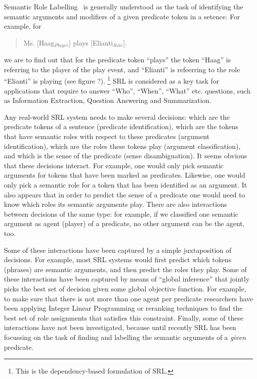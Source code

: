 
Semantic Role Labelling~\citep[SRL, ][]{carreras05introduction}
is generally understood as the task of identifying the semantic arguments
and modifiers of a given predicate token in a setence. For example,
for
\begin{quote}
Ms. {[}Haag$_{Player}$] plays {[}Elianti$_{Role}$].
\end{quote}
we are to find out that for the predicate token {}``plays'' the
token {}``Haag'' is referring to the player of the play event, and
{}``Elianti'' is refeerring to the role {}``Elianti'' is playing
(see figure ?).%
\footnote{This is the dependency-based formulation of SRL.%
} SRL is considered as a key task for applications that require to
answer {}``Who'', {}``When'', {}``What'' etc. questions, such
as Information Extraction, Question Answering and Summarization. 

Any real-world SRL system needs to make several decisions: which are
the predicate tokens of a sentence (predicate identification), which
are the tokens that have semantic roles with respect to these predicates
(argument identification), which are the roles these tokens play (argument
classification), and which is the sense of the predicate (sense disambiguation).
It seems obvious that these decisions interact. For example, one would
only pick semantic arguments for tokens that have been marked as predicates.
Likewise, one would only pick a semantic role for a token that has
been identified as an argument. It also appears that in order to predict
the sense of a predicate one would need to know which roles its semantic
arguments play. There are also interactions between decisions of the
same type: for example, if we classified one semantic argument as
agent (player) of a predicate, no other argument can be the agent,
too. 

Some of these interactions have been captured by a simple juxtaposition
of decisions. For example, most SRL systems would first predict which
tokens (phrases) are semantic arguments, and then predict the roles
they play. Some of these interactions have been captured by means
of {}``global inference'' that jointly picks the best set of decision
given some global objective function. For example, to make sure that
there is not more than one agent per predicate researchers have been
applying Integer Linear Programming or reranking techniques to find
the best set of role assignments that satisfies this constraint. Finally,
some of these interactions have not been investigated, because until
recently SRL has been focussing on the task of finding and labelling
the semantic arguments of a \emph{given} predicate. 

